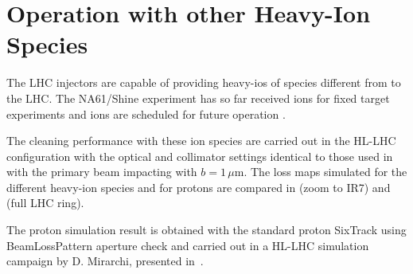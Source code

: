 









\section{Operation with other Heavy-Ion Species}

The LHC injectors are capable of providing heavy-ios of species different from \lead to the LHC. The NA61/Shine experiment has so far received  ions for fixed target experiments and  ions are scheduled for future operation \cite{EDMS:1570447,CERN-2014-006}. 

The cleaning performance with these ion species are carried out in the HL-LHC configuration with the optical and collimator settings identical to those used in  with the primary beam impacting with $b=1\,\mu$m. The loss maps simulated for the different heavy-ion species and for protons are compared in  (zoom to IR7) and  (full LHC ring). 

The proton simulation result is obtained with the standard proton SixTrack using BeamLossPattern aperture check and carried out in a HL-LHC simulation campaign by D. Mirarchi, presented in~\cite{IPAC16:WEPMW030}. 

